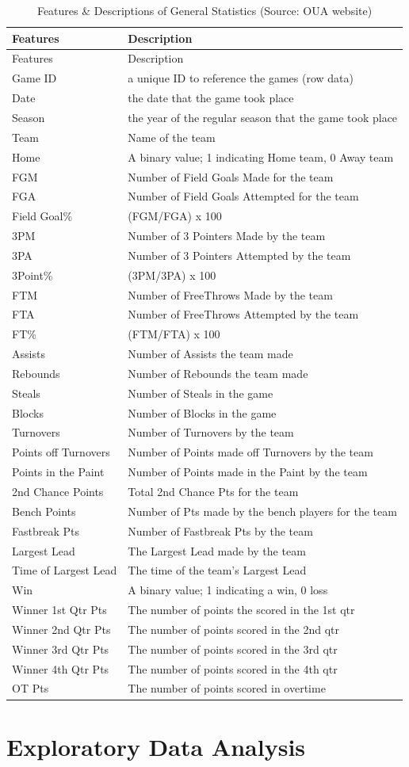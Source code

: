 \documentclass[]{book}
\begin{document}
\begin{longtable}[]{@{}ll@{}}
\caption{\label{tab:general-stats} Features \& Descriptions of General Statistics (Source: OUA website)}\tabularnewline
\toprule
Features & Description\tabularnewline
\midrule
\endfirsthead
\toprule
Features & Description\tabularnewline
\midrule
\endhead
Game ID & a unique ID to reference the games (row data)\tabularnewline
Date & the date that the game took place\tabularnewline
Season & the year of the regular season that the game took place\tabularnewline
Team & Name of the team\tabularnewline
Home & A binary value; 1 indicating Home team, 0 Away team\tabularnewline
FGM & Number of Field Goals Made for the team\tabularnewline
FGA & Number of Field Goals Attempted for the team\tabularnewline
Field Goal\% & (FGM/FGA) x 100\tabularnewline
3PM & Number of 3 Pointers Made by the team\tabularnewline
3PA & Number of 3 Pointers Attempted by the team\tabularnewline
3Point\% & (3PM/3PA) x 100\tabularnewline
FTM & Number of FreeThrows Made by the team\tabularnewline
FTA & Number of FreeThrows Attempted by the team\tabularnewline
FT\% & (FTM/FTA) x 100\tabularnewline
Assists & Number of Assists the team made\tabularnewline
Rebounds & Number of Rebounds the team made\tabularnewline
Steals & Number of Steals in the game\tabularnewline
Blocks & Number of Blocks in the game\tabularnewline
Turnovers & Number of Turnovers by the team\tabularnewline
Points off Turnovers & Number of Points made off Turnovers by the team\tabularnewline
Points in the Paint & Number of Points made in the Paint by the team\tabularnewline
2nd Chance Points & Total 2nd Chance Pts for the team\tabularnewline
Bench Points & Number of Pts made by the bench players for the team\tabularnewline
Fastbreak Pts & Number of Fastbreak Pts by the team\tabularnewline
Largest Lead & The Largest Lead made by the team\tabularnewline
Time of Largest Lead & The time of the team's Largest Lead\tabularnewline
Win & A binary value; 1 indicating a win, 0 loss\tabularnewline
Winner 1st Qtr Pts & The number of points the scored in the 1st qtr\tabularnewline
Winner 2nd Qtr Pts & The number of points scored in the 2nd qtr\tabularnewline
Winner 3rd Qtr Pts & The number of points scored in the 3rd qtr\tabularnewline
Winner 4th Qtr Pts & The number of points scored in the 4th qtr\tabularnewline
OT Pts & The number of points scored in overtime\tabularnewline
\bottomrule
\end{longtable}

\hypertarget{exploratory-data-analysis}{%
\chapter{Exploratory Data Analysis}\label{exploratory-data-analysis}}
\end{document}
